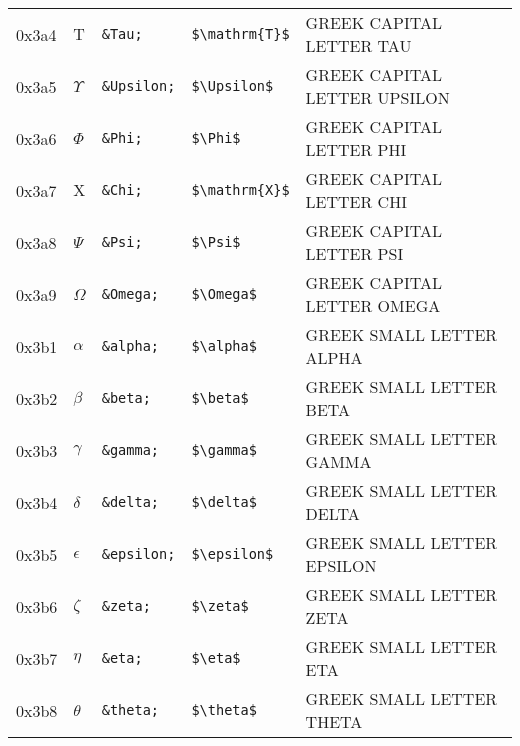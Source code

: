 \documentclass[a4paper,10pt]{article}
\begin{document}
{\begin{center}
\begin{xtabular}{llllp{10cm}}
0x3a4  & $\mathrm{T}$           & \texttt{\&Tau;}     & \texttt{\${\textbackslash}mathrm\{T\}\$}               & GREEK CAPITAL LETTER TAU                   \\
0x3a5  & $\Upsilon$             & \texttt{\&Upsilon;} & \texttt{\${\textbackslash}Upsilon\$}                   & GREEK CAPITAL LETTER UPSILON               \\
0x3a6  & $\Phi$                 & \texttt{\&Phi;}     & \texttt{\${\textbackslash}Phi\$}                       & GREEK CAPITAL LETTER PHI                   \\
0x3a7  & $\mathrm{X}$           & \texttt{\&Chi;}     & \texttt{\${\textbackslash}mathrm\{X\}\$}               & GREEK CAPITAL LETTER CHI                   \\
0x3a8  & $\Psi$                 & \texttt{\&Psi;}     & \texttt{\${\textbackslash}Psi\$}                       & GREEK CAPITAL LETTER PSI                   \\
0x3a9  & $\Omega$               & \texttt{\&Omega;}   & \texttt{\${\textbackslash}Omega\$}                     & GREEK CAPITAL LETTER OMEGA                 \\
0x3b1  & $\alpha$               & \texttt{\&alpha;}   & \texttt{\${\textbackslash}alpha\$}                     & GREEK SMALL LETTER ALPHA                   \\
0x3b2  & $\beta$                & \texttt{\&beta;}    & \texttt{\${\textbackslash}beta\$}                      & GREEK SMALL LETTER BETA                    \\
0x3b3  & $\gamma$               & \texttt{\&gamma;}   & \texttt{\${\textbackslash}gamma\$}                     & GREEK SMALL LETTER GAMMA                   \\
0x3b4  & $\delta$               & \texttt{\&delta;}   & \texttt{\${\textbackslash}delta\$}                     & GREEK SMALL LETTER DELTA                   \\
0x3b5  & $\epsilon$             & \texttt{\&epsilon;} & \texttt{\${\textbackslash}epsilon\$}                   & GREEK SMALL LETTER EPSILON                 \\
0x3b6  & $\zeta$                & \texttt{\&zeta;}    & \texttt{\${\textbackslash}zeta\$}                      & GREEK SMALL LETTER ZETA                    \\
0x3b7  & $\eta$                 & \texttt{\&eta;}     & \texttt{\${\textbackslash}eta\$}                       & GREEK SMALL LETTER ETA                     \\
0x3b8  & $\theta$               & \texttt{\&theta;}   & \texttt{\${\textbackslash}theta\$}                     & GREEK SMALL LETTER THETA                   \\

\end{xtabular}
\end{center}}
\end{document}
